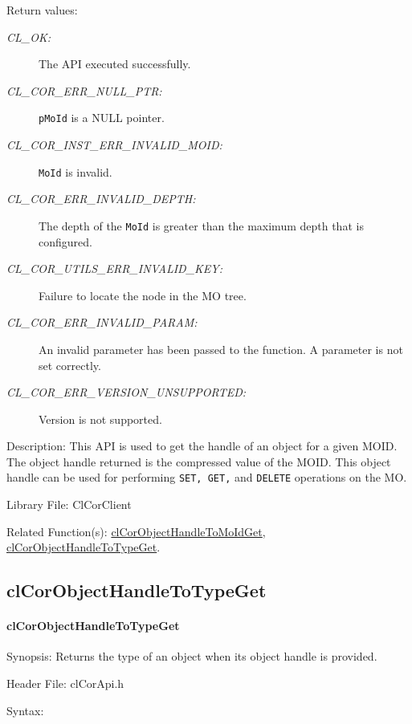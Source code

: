 \begin{flushleft}
\begin{Desc}
\end{Desc}
\begin{Desc}
\item[Return values:]
\begin{description}
\item[{\em CL\_\-OK:}]The API executed successfully. 
\item[{\em CL\_\-COR\_\-ERR\_\-NULL\_\-PTR:}]{\tt{pMoId}} is a NULL pointer. 
\item[{\em CL\_\-COR\_\-INST\_\-ERR\_\-INVALID\_\-MOID:}] {\tt{MoId}} is invalid.
\item[{\em CL\_\-COR\_\-ERR\_\-INVALID\_\-DEPTH:}] The depth of the {\tt{MoId}} is greater than the maximum depth that is configured.
\item[{\em CL\_\-COR\_\-UTILS\_\-ERR\_\-INVALID\_\-KEY:}] Failure to locate the node in the MO tree.
\item[{\em CL\_\-COR\_\-ERR\_\-INVALID\_\-PARAM:}] An invalid parameter has been passed to the function. A parameter is not set correctly.
\item[{\em CL\_\-COR\_\-ERR\_\-VERSION\_\-UNSUPPORTED:}] Version is not supported.\end{description}
\end{Desc}
\begin{Desc}
\item[Description:]
This API is used to get the handle of an object for a given MOID. The object handle returned is the compressed value of the MOID. This object
handle can be used for performing {\tt{SET, GET,}} and {\tt{DELETE}} operations on the MO.
\end{Desc}
\begin{Desc}
\item[Library File:]Cl\-Cor\-Client\end{Desc}
\begin{Desc}
\item[Related Function(s):]\hyperlink{pagecor51}{clCorObjectHandleToMoIdGet}, \hyperlink{pagecor50}{clCorObjectHandleToTypeGet}. \end{Desc}
\newpage





\subsection{clCorObjectHandleToTypeGet}
\hypertarget{pagecor109}{}\paragraph{cl\-Cor\-Object\-Handle\-To\-Type\-Get}\label{pagecor109}
\begin{Desc}
\item[Synopsis:]Returns the type of an object when its object handle is provided.\end{Desc}
\begin{Desc}
\item[Header File:]clCorApi.h\end{Desc}
\begin{Desc}
\item[Syntax:]


\end{Desc}
\end{flushleft}
